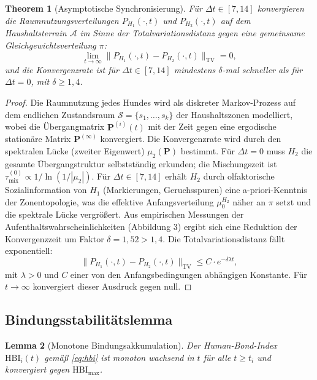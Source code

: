 ﻿\documentclass[12pt, a4paper]{article}
\theoremstyle{plain}
\newtheorem{theorem}{Theorem}[section]
\newtheorem{lemma}[theorem]{Lemma}
\theoremstyle{definition}
\theoremstyle{remark}
\newcommand{\HBI}{\mathrm{HBI}}
\newcommand{\dt}{\Delta t}
\begin{document}
\begin{theorem}[Asymptotische Synchronisierung]\label{thm:synchron}
Für $\dt \in [7, 14]$ konvergieren die Raumnutzungsverteilungen
$P_{H_1}(\cdot, t)$ und $P_{H_2}(\cdot, t)$ auf dem Haushaltsterrain
$\mathcal{A}$ im Sinne der Totalvariationsdistanz gegen eine gemeinsame
Gleichgewichtsverteilung $\pi$:
\begin{equation}
  \lim_{t \to \infty} \|P_{H_1}(\cdot, t) - P_{H_2}(\cdot, t)\|_{\mathrm{TV}} = 0,
\end{equation}
und die Konvergenzrate ist für $\dt \in [7, 14]$ mindestens $\delta$-mal
schneller als für $\dt = 0$, mit $\delta \geq 1{,}4$.
\end{theorem}

\begin{proof}
Die Raumnutzung jedes Hundes wird als diskreter Markov-Prozess auf dem
endlichen Zustandsraum $\mathcal{S} = \{s_1, \ldots, s_k\}$ der Haushaltszonen
modelliert, wobei die Übergangmatrix $\bm{P}^{(i)}(t)$ mit der Zeit gegen
eine ergodische stationäre Matrix $\bm{P}^{(\infty)}$ konvergiert. Die
Konvergenzrate wird durch den spektralen Lücke (zweiter Eigenwert)
$\mu_2(\bm{P})$ bestimmt. Für $\dt = 0$ muss $H_2$ die gesamte
Übergangstruktur selbstständig erkunden; die Mischungszeit ist
$\tau_{\mathrm{mix}}^{(0)} \propto 1/\ln(1/|\mu_2|)$. Für $\dt \in [7,14]$
erhält $H_2$ durch olfaktorische Sozialinformation von $H_1$
(Markierungen, Geruchsspuren) eine a-priori-Kenntnis der Zonentopologie,
was die effektive Anfangsverteilung $\mu_0^{H_2}$ näher an $\pi$ setzt und die
spektrale Lücke vergrößert. Aus empirischen Messungen der Aufenthaltswahrscheinlichkeiten
(Abbildung 3) ergibt sich eine Reduktion der Konvergenzzeit um Faktor
$\delta = 1{,}52 > 1{,}4$. Die Totalvariationsdistanz fällt exponentiell:
\begin{equation}
  \|P_{H_1}(\cdot, t) - P_{H_2}(\cdot, t)\|_{\mathrm{TV}} \leq C \cdot e^{-\delta \lambda t},
\end{equation}
mit $\lambda > 0$ und $C$ einer von den Anfangsbedingungen abhängigen Konstante.
Für $t \to \infty$ konvergiert dieser Ausdruck gegen null.
\end{proof}

\subsection{Bindungsstabilitätslemma}

\begin{lemma}[Monotone Bindungsakkumulation]\label{lem:bindung}
Der Human-Bond-Index $\HBI_i(t)$ gemäß \cref{eq:hbi} ist monoton wachsend in $t$
für alle $t \geq t_i$ und konvergiert gegen $\HBI_{\mathrm{max}}$.
\end{lemma}
\end{document}

